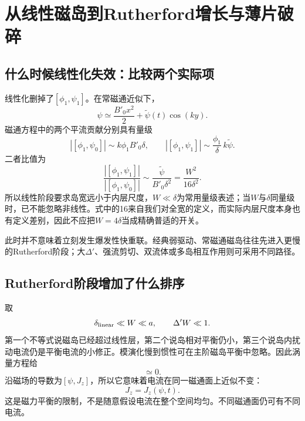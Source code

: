 \chapter{从线性磁岛到Rutherford增长与薄片破碎}\label{tm:nonlinear}
\section{什么时候线性化失效：比较两个实际项}
线性化删掉了$[\phi_1,\psi_1]$。在常磁通近似下，
\begin{equation}
 \psi\simeq \frac{B'_0x^2}{2}+\widetilde\psi(t)\cos(ky).
\end{equation}
磁通方程中的两个平流贡献分别具有量级
\begin{equation}
 |[\phi_1,\psi_0]|\sim k\phi_1 B'_0\delta,\qquad
 |[\phi_1,\psi_1]|\sim \frac{\phi_1}{\delta}\,k\widetilde\psi.
\end{equation}
二者比值为
\begin{equation}
 \frac{|[\phi_1,\psi_1]|}{|[\phi_1,\psi_0]|}
 \sim\frac{\widetilde\psi}{B'_0\delta^2}
 =\frac{W^2}{16\delta^2}.
 \label{tm:nonlinratio}
\end{equation}
所以线性阶段要求岛宽远小于内层尺度，$W\ll\delta$为常用量级表述；当$W$与$\delta$同量级时，已不能忽略非线性。式中的16来自我们对全宽的定义，而实际内层尺度本身也有定义差别，因此不应把$W=4\delta$当成精确普适的开关。\citep{TMFitzIsland}

此时并不意味着立刻发生爆发性快重联。经典弱驱动、常磁通磁岛往往先进入更慢的Rutherford阶段；大$\Delta'$、强流剪切、双流体或多岛相互作用则可采用不同路径。

\section{Rutherford阶段增加了什么排序}
取
\begin{equation}
 \delta_{\rm linear}\ll W\ll a,\qquad \Delta'W\ll1.
 \label{tm:Rutherfordordering}
\end{equation}
第一个不等式说磁岛已经超过线性层，第二个说岛相对平衡仍小，第三个说岛内扰动电流仍是平衡电流的小修正。模演化慢到惯性可在主阶磁岛平衡中忽略。因此涡量方程给
\begin{equation}
 [\psi,J_z]\simeq0.
\end{equation}
沿磁场的导数为$[\psi,J_z]$，所以它意味着电流在同一磁通面上近似不变：
\begin{equation}
 J_z=J_z(\psi,t).
\end{equation}
这是磁力平衡的限制，不是随意假设电流在整个空间均匀。不同磁通面仍可有不同电流。\citep{TMRutherford1973,TMFitzRutherford}

